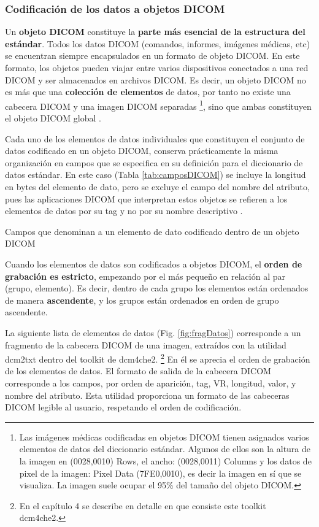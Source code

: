 \subsubsection{Codificación de los datos a objetos \acs{DICOM}}
Un \textbf{objeto \acs{DICOM}} constituye la \textbf{parte más esencial de la estructura del estándar}. Todos los datos \acs{DICOM} (comandos, informes, imágenes médicas, etc) se encuentran siempre encapsulados en un formato de objeto \acs{DICOM}. En este formato, los objetos pueden viajar entre varios dispositivos conectados a una red \acs{DICOM} y ser almacenados en archivos \acs{DICOM}. Es decir, un objeto DICOM no es más que una \textbf{colección de elementos} de datos, por tanto no existe una cabecera DICOM y una imagen DICOM separadas \footnote{Las imágenes médicas codificadas en objetos DICOM tienen asignados varios elementos de datos del diccionario estándar. Algunos de ellos son la altura de la imagen en (0028,0010) Rows, el ancho: (0028,0011) Columns y los datos de pixel de la imagen: Pixel Data (7FE0,0010), es decir la imagen en sí que se visualiza. La imagen suele ocupar el 95\% del tamaño del objeto DICOM.}, sino que ambas constituyen el objeto DICOM global \cite{10}.

Cada uno de los elementos de datos individuales que constituyen el conjunto de datos codificado en un objeto DICOM, conserva prácticamente la misma organización en campos que se especifica en su definición para el diccionario de datos estándar. En este caso (Tabla \ref{tab:camposDICOM}) se incluye la longitud en bytes del elemento de dato, pero se excluye el campo del nombre del atributo, pues las aplicaciones DICOM que interpretan estos objetos se refieren a los elementos de datos por su tag y no por su nombre descriptivo \cite{15}.

\begin{table}[hp]
\centering{
\small
}
\caption{Campos que denominan a un elemento de dato codificado dentro de un objeto DICOM}
\label{tab:camposDICOM}
\end{table}

Cuando los elementos de datos son codificados a objetos DICOM, el \textbf{orden de grabación es estricto}, empezando por el más pequeño en relación al par (grupo, elemento). Es decir, dentro de cada grupo los elementos están ordenados de manera \textbf{ascendente}, y los grupos están ordenados en orden de grupo ascendente.

La siguiente lista de elementos de datos (Fig. \ref{fig:fragDatos}) corresponde a un fragmento de la cabecera DICOM de una imagen, extraídos con la utilidad dcm2txt dentro del toolkit de dcm4che2. \footnote{En el capítulo 4 se describe en detalle en que consiste este toolkit dcm4che2.} En él se aprecia el orden de grabación de los elementos de datos. El formato de salida de la cabecera DICOM corresponde a los campos, por orden de aparición, tag, VR, longitud, valor, y nombre del atributo. Esta utilidad proporciona un formato de las cabeceras DICOM legible al usuario, respetando el orden de codificación.

